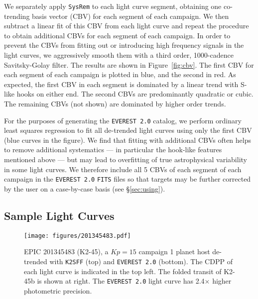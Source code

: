 \documentclass[]{emulateapj}
\newcommand{\Kp}{\ensuremath{Kp}}
\begin{document}
We separately apply \texttt{SysRem} to each light curve segment, obtaining one
co-trending basis vector (CBV) for each segment of each campaign. We then subtract a linear
fit of this CBV from each light curve and repeat the procedure to obtain additional CBVs
for each segment of each campaign. In order to prevent the CBVs from fitting out or
introducing high frequency signals in the light curves, we aggressively smooth them
with a third order, 1000-cadence Savitsky-Golay filter. The results are shown in
Figure~\ref{fig:cbv}. The first CBV for each segment of each campaign is plotted in blue,
and the second in red. As expected, the first CBV in each segment is dominated by a linear trend with S-like
hooks on either end. The second CBVs are predominantly quadratic or cubic. The remaining
CBVs (not shown) are dominated by higher order trends.

For the purposes of generating the \texttt{EVEREST 2.0} catalog,
we perform ordinary least squares regression to fit all de-trended light curves
using only the first CBV (blue curves in the figure). We find that fitting with additional CBVs often helps
to remove additional systematics --- in particular the hook-like features mentioned above
--- but may lead to overfitting of true astrophysical variability in some light curves.
We therefore include all 5 CBVs of each segment of each campaign in the \texttt{EVEREST 2.0} \texttt{FITS} files
so that targets may be further corrected by the user on a case-by-case basis (see \S\ref{sec:using}).


\subsection{Sample Light Curves}
\label{sec:sample}

\begin{figure}[hbt]
  \begin{center}
      \texttt{[image: figures/201345483.pdf]}
       \caption{EPIC 201345483 (K2-45), a $\Kp = 15$ campaign 1 planet host de-trended
       with \texttt{K2SFF} (top) and \texttt{EVEREST 2.0} (bottom). The CDPP of each light curve
       is indicated in the top left. The folded transit of K2-45b is shown at right. The \texttt{EVEREST 2.0}
       light curve has 2.4$\times$ higher photometric precision.}
     \label{fig:201345483}
  \end{center}
\end{figure}
\end{document}
